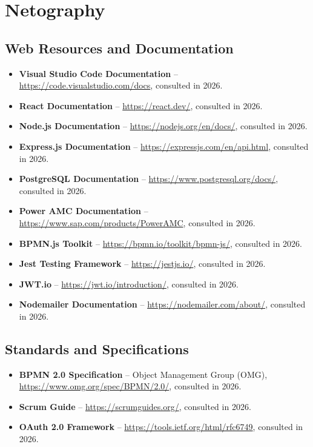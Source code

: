\chapter*{Netography}

\section*{Web Resources and Documentation}

\begin{itemize}
\item \textbf{Visual Studio Code Documentation} -- \url{https://code.visualstudio.com/docs}, consulted in 2026.
\item \textbf{React Documentation} -- \url{https://react.dev/}, consulted in 2026.
\item \textbf{Node.js Documentation} -- \url{https://nodejs.org/en/docs/}, consulted in 2026.
\item \textbf{Express.js Documentation} -- \url{https://expressjs.com/en/api.html}, consulted in 2026.
\item \textbf{PostgreSQL Documentation} -- \url{https://www.postgresql.org/docs/}, consulted in 2026.
\item \textbf{Power AMC Documentation} -- \url{https://www.sap.com/products/PowerAMC}, consulted in 2026.
\item \textbf{BPMN.js Toolkit} -- \url{https://bpmn.io/toolkit/bpmn-js/}, consulted in 2026.
\item \textbf{Jest Testing Framework} -- \url{https://jestjs.io/}, consulted in 2026.
\item \textbf{JWT.io} -- \url{https://jwt.io/introduction/}, consulted in 2026.
\item \textbf{Nodemailer Documentation} -- \url{https://nodemailer.com/about/}, consulted in 2026.
\end{itemize}

\section*{Standards and Specifications}

\begin{itemize}
\item \textbf{BPMN 2.0 Specification} -- Object Management Group (OMG), \url{https://www.omg.org/spec/BPMN/2.0/}, consulted in 2026.
\item \textbf{Scrum Guide} -- \url{https://scrumguides.org/}, consulted in 2026.
\item \textbf{OAuth 2.0 Framework} -- \url{https://tools.ietf.org/html/rfc6749}, consulted in 2026.
\end{itemize}

